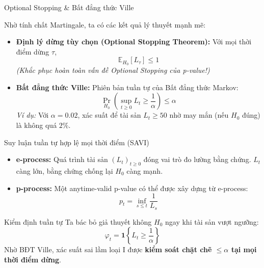 \begin{frame}{Optional Stopping \& Bất đẳng thức Ville}

Nhờ tính chất Martingale, ta có các kết quả lý thuyết mạnh mẽ:

\begin{itemize}
    \item \textbf{Định lý dừng tùy chọn (Optional Stopping Theorem):} Với mọi thời điểm dừng $\tau$,
    \[ \mathbb{E}_{H_0}[L_\tau] \le 1 \]
    \textit{(Khắc phục hoàn toàn vấn đề Optional Stopping của p-value!)}

    \vspace{0.2cm}
    \item \textbf{Bất đẳng thức Ville:} Phiên bản tuần tự của Bất đẳng thức Markov:
    \[ \Pr_{H_0} \left( \sup_{t\ge 0} L_t \ge \frac{1}{\alpha} \right) \le \alpha \]
    \textit{Ví dụ:} Với $\alpha = 0.02$, xác suất để tài sản $L_t \ge 50$ nhờ may mắn (nếu $H_0$ đúng) là không quá $2\%$.
\end{itemize}

\end{frame}

\begin{frame}{Suy luận tuần tự hợp lệ mọi thời điểm (SAVI)}

\begin{itemize}
    \item \textbf{e-process:} Quá trình tài sản $(L_t)_{t\ge 0}$ đóng vai trò đo lường bằng chứng. $L_t$ càng lớn, bằng chứng chống lại $H_0$ càng mạnh.
    \item \textbf{p-process:} Một anytime-valid p-value có thể được xây dựng từ e-process:
    \[ p_t = \inf_{s\le t} \frac{1}{L_s} \]
\end{itemize}

\begin{block}{Kiểm định tuần tự}
Ta bác bỏ giả thuyết không $H_0$ ngay khi tài sản vượt ngưỡng:
\[ \varphi_t = \mathbf{1} \left\{ L_t \ge \frac{1}{\alpha} \right\} \]
Nhờ BĐT Ville, xác suất sai lầm loại I được \textbf{kiểm soát chặt chẽ $\le \alpha$ tại mọi thời điểm dừng}.
\end{block}

\end{frame}

